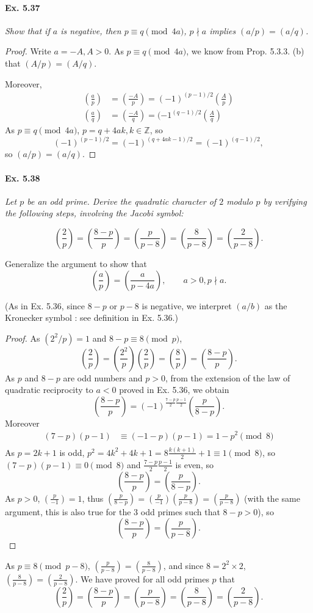 \documentclass[11pt,a4paper]{article}
\newcommand{\Z}{\mathbb{Z}}
\newcommand{\legendre}[2]{\genfrac{(}{)}{}{}{#1}{#2}}
\begin{document}
\paragraph{Ex. 5.37}

{\it Show that if $a$ is negative, then $p \equiv q \pmod {4a}$, $p \nmid a$ implies $(a/p) = (a/q)$.
}

\begin{proof}
Write $a = -A, A>0$. As $p \equiv q \pmod {4a}$, we know from Prop. 5.3.3. (b) that $(A/p) = (A/q)$.

Moreover,
\begin{align*}
\legendre{a}{p}&= \legendre{-A}{p} = (-1)^{(p-1)/2} \legendre{A}{p}\\
\legendre{a}{q}&= \legendre{-A}{q} = (-1^{(q-1)/2} \legendre{A}{q}
\end{align*}
As  $p \equiv q \pmod {4a}$, $ p = q + 4ak, k\in \Z$, so
$$(-1)^{(p-1)/2} = (-1)^{(q+4ak-1)/2} = (-1)^{(q-1)/2},$$
so $(a/p) = (a/q)$.
\end{proof}

\paragraph{Ex. 5.38}

{\it Let $p$ be an odd prime. Derive the quadratic character of $2$ modulo $p$ by verifying the following steps, involving the Jacobi symbol:

$$
 \legendre{2}{p} = \legendre{8-p}{p} = \legendre{p}{p-8} = \legendre{8}{p-8} = \legendre{2}{p-8}.
$$

Generalize the argument to show that
$$
  \left(\frac{a}{p}\right) = \left(\frac{a}{p-4a}\right), \qquad a>0, p \nmid a.
$$
}
(As in Ex. 5.36, since $8 - p$ or $p-8$ is negative, we interpret $(a/b)$ as the Kronecker symbol : see definition in Ex. 5.36.)
\begin{proof}
As $(2^2/p) = 1$ and $8-p \equiv 8 \pmod p$,
$$ \legendre{2}{p} = \legendre{2^2}{p} \legendre{2}{p} = \legendre{8}{p} = \legendre{8-p}{p}.$$
As $p$ and $8-p$ are odd numbers and $p>0$, from the extension of the law of quadratic reciprocity to $a<0$ proved in Ex. 5.36, we obtain
$$\legendre{8-p}{p} = (-1)^{\frac{7-p}{2} \frac{p-1}{2}} \legendre{p}{8-p}.$$
Moreover
\begin{align*}
(7-p)(p-1) &\equiv (-1-p)(p-1) = 1 - p^2 \pmod 8\\
\end{align*}
As $p= 2k+1$ is odd, $p^2 = 4k^2+4k+1 = 8 \frac{k(k+1)}{2} + 1 \equiv 1 \pmod 8$, so $(7-p)(p-1) \equiv 0 \pmod 8$ and $\frac{7-p}{2} \frac{p-1}{2}$ is even, so
$$\legendre{8-p}{p} = \legendre{p}{8-p}.$$
As $p>0$, $\legendre{p}{-1} = 1$, thus $ \legendre{p}{8-p} = \legendre{p}{-1}  \legendre{p}{p-8} = \legendre{p}{p-8}$ (with the same argument, this is also true for the  3 odd primes such that $8-p>0$), so
$$\legendre{8-p}{p} = \legendre{p}{p-8}.$$
\end{proof}
As $p\equiv 8 \pmod{p-8}$, $\legendre{p}{p-8}  = \legendre{8}{p-8}$, and since $8 = 2^2\times 2$, $\legendre{8}{p-8} = \legendre{2}{p-8}$. We have proved for all odd primes $p$ that
$$  \legendre{2}{p} = \legendre{8-p}{p} = \legendre{p}{p-8} = \legendre{8}{p-8} = \legendre{2}{p-8}.$$
\end{document}
